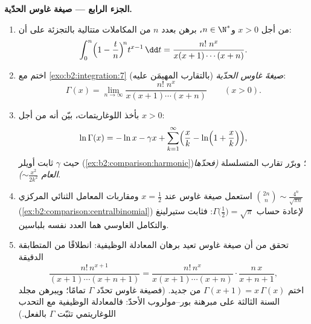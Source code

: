 \begin{problem}
\medskip
\noindent\textbf{الجزء الرابع --- صيغة غاوس الحدّية.}
\begin{enumerate}[resume]
  \item من أجل $x > 0$ و$n \in \N^*$، برهن بعدد $n$ من المكاملات
        متتالية بالتجزئة على أن:
        \[
        \int_0^n \Bigl(1 - \frac tn\Bigr)^{\!n} t^{x-1}\,\dd t
        = \frac{n!\;n^x}{x(x+1)\cdots(x+n)} .
        \]
  \item اختم مع \cref{exo:b2:integration:7} (بالتقارب
        المهيمَن عليه) \emph{صيغةَ غاوس الحدّية}:
        \[
        \Gamma(x) = \lim_{n\to\infty}
        \frac{n!\;n^x}{x(x+1)\cdots(x+n)}
        \qquad (x > 0).
        \]
  \item بأخذ اللوغاريتمات، بيّن أنه من أجل $x > 0$:
        \[
        \ln\Gamma(x) = -\ln x - \gamma x +
        \sum_{k=1}^{\infty}\Bigl(\frac xk -
        \ln\Bigl(1 + \frac xk\Bigr)\Bigr),
        \]
        حيث $\gamma$ ثابت أويلر
        (\cref{ex:b2:comparison:harmonic})؛ وبرّر
        تقارب المتسلسلة \emph{(فحدّها العام
        $\sim \frac{x^2}{2k^2}$)}.
  \item استعمل صيغة غاوس عند $x = \frac12$ ومقاربات المعامل
        الثنائي المركزي $\binom{2n}{n} \sim
        \frac{4^n}{\sqrt{\pi n}}$
        (\cref{ex:b2:comparison:centralbinomial}) لإعادة حساب
        $\Gamma\bigl(\frac12\bigr) = \sqrt\pi$: فثابت ستيرلينغ
        والتكامل الغاوسي هما العدد نفسه
        بلباسين.
  \item تحقق من أن صيغة غاوس تعيد برهان المعادلة
        الوظيفية: انطلاقًا من المتطابقة الدقيقة
        \[
        \frac{n!\,n^{x+1}}{(x+1)\cdots(x+n+1)}
        = \frac{n!\,n^{x}}{x(x+1)\cdots(x+n)}\cdot
        \frac{n\,x}{x+n+1},
        \]
        اختم $\Gamma(x+1) = x\,\Gamma(x)$ من جديد. (فصيغة غاوس
        تحدّد $\Gamma$ تمامًا؛ ويبرهن مجلد السنة الثالثة
        على مبرهنة بور--مولروب الأحدّ: فالمعادلة الوظيفية
        مع التحدب اللوغاريتمي تثبّت $\Gamma$ بالفعل.)
\end{enumerate}


\end{problem}
